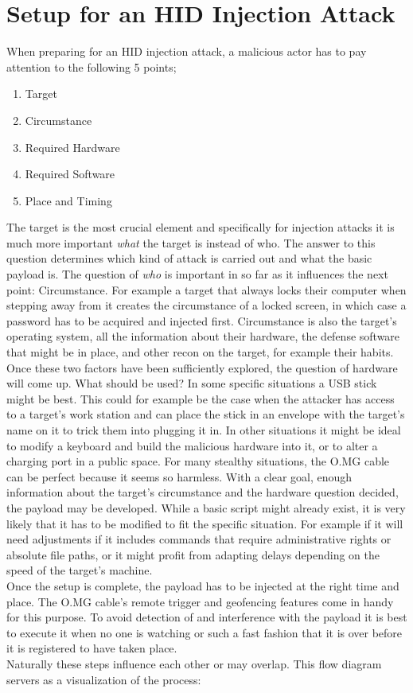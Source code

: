 \section{Setup for an HID Injection Attack}

When preparing for an HID injection attack, a malicious actor has to pay attention to the following 5 points;
\begin{enumerate}
    \item Target
    \item Circumstance 
    \item Required Hardware
    \item Required Software
    \item Place and Timing
\end{enumerate}

The target is the most crucial element and specifically for injection attacks it is much more important \emph{what} the target is instead of who. The answer to this question determines which kind of attack is carried out and what the basic payload is. The question of \emph{who} is important in so far as it influences the next point: Circumstance. For example a target that always locks their computer when stepping away from it creates the circumstance of a locked screen, in which case a password has to be acquired and injected first. Circumstance is also the target's operating system, all the information about their hardware, the defense software that might be in place, and other recon on the target, for example their habits. Once these two factors have been sufficiently explored, the question of hardware will come up. What should be used? In some specific situations a USB stick might be best. This could for example be the case when the attacker has access to a target's work station and can place the stick in an envelope with the target's name on it to trick them into plugging it in. In other situations it might be ideal to modify a keyboard and build the malicious hardware into it, or to alter a charging port in a public space. For many stealthy situations, the O.MG cable can be perfect because it seems so harmless. With a clear goal, enough information about the target's circumstance and the hardware question decided, the payload may be developed. While a basic script might already exist, it is very likely that it has to be modified to fit the specific situation. For example if it will need adjustments if it includes commands that require administrative rights or absolute file paths, or it might profit from adapting delays depending on the speed of the target's machine. \\
Once the setup is complete, the payload has to be injected at the right time and place. The O.MG cable's remote trigger and geofencing features come in handy for this purpose. To avoid detection of and interference with the payload it is best to execute it when no one is watching or such a fast fashion that it is over before it is registered to have taken place.\\
Naturally these steps influence each other or may overlap. This flow diagram servers as a visualization of the process:

